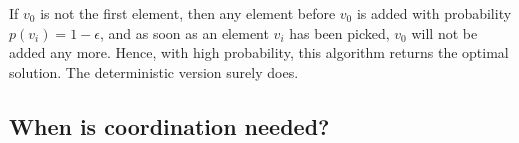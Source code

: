 If $v_0$ is not the first element, then any element before $v_0$ is added with probability $p(v_i) = 1-\epsilon$, and as soon as an element $v_i$ has been picked, $v_0$ will not be added any more. Hence, with high probability, this algorithm returns the optimal solution. The deterministic version surely does.


\subsection{When is coordination needed?}

